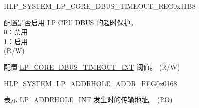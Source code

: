 \begin{register}{H}{LP\_SYSTEM\_LP\_CORE\_DBUS\_TIMEOUT\_REG}{0x01B8}\label{regdesc:LPSYSTEMLPCOREDBUSTIMEOUTREG}
%
%
%
\regnewline%
\begin{regdesc}\begin{reglist}
\label{fielddesc:LPSYSTEMLPCOREDBUSTIMEOUTEN}\item [LP\_SYSTEM\_LP\_CORE\_DBUS\_TIMEOUT\_EN] 配置是否启用 LP CPU DBUS 的超时保护。 \\
0：禁用\\
1：启用\\
(R/W)
\label{fielddesc:LPSYSTEMLPCOREDBUSTIMEOUTTHRES}\item [LP\_SYSTEM\_LP\_CORE\_DBUS\_TIMEOUT\_THRES] 配置 \hyperref[tab:sysreg-int-sources]{LP\_CORE\_DBUS\_TIMEOUT\_INT} 阈值。 (R/W)
\end{reglist}\end{regdesc}
\end{register}


\begin{register}{H}{LP\_SYSTEM\_LP\_ADDRHOLE\_ADDR\_REG}{0x0168}\label{regdesc:LPSYSTEMLPADDRHOLEADDRREG}
%
\regnewline%
\begin{regdesc}\begin{reglist}
\label{fielddesc:LPSYSTEMLPADDRHOLEADDR}\item [LP\_SYSTEM\_LP\_ADDRHOLE\_ADDR] 表示 \hyperref[tab:sysreg-int-sources]{LP\_ADDRHOLE\_INT} 发生时的传输地址。 (RO)
\end{reglist}\end{regdesc}
\end{register}


